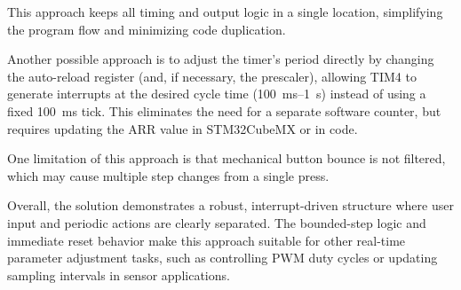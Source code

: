 This approach keeps all timing and output logic in a single location, simplifying the program flow and minimizing code duplication. 

Another possible approach is to adjust the timer’s period directly by changing the auto-reload register (and, if necessary, the prescaler), allowing TIM4 to generate interrupts at the desired cycle time (\SI{100}{\milli\second}–\SI{1}{\second}) instead of using a fixed \SI{100}{\milli\second} tick. 
This eliminates the need for a separate software counter, but requires updating the ARR value in STM32CubeMX or in code.

One limitation of this approach is that mechanical button bounce is not filtered, which may cause multiple step changes from a single press.

Overall, the solution demonstrates a robust, interrupt-driven structure where user input and periodic actions are clearly separated. The bounded-step logic and immediate reset behavior make this approach suitable for other real-time parameter adjustment tasks, such as controlling PWM duty cycles or updating sampling intervals in sensor applications.




